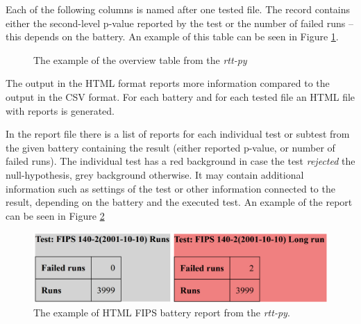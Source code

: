 \documentclass[
  digital,     %
  oneside,     %
  nosansbold,  %
  nocolorbold, %
  nolof,         %
  nolot,         %
]{fithesis4}
\begin{document}
Each of the following columns is named after one tested file. The record contains either the second-level p-value reported by the test or the number of failed runs -- this depends on the battery. An example of this table can be seen in Figure \ref{fig:rtt_py_table}.

\begin{figure}
  \begin{center}
  \end{center}
  \caption{The example of the overview table from the \emph{rtt-py}}
  \label{fig:rtt_py_table}
\end{figure}


The output in the HTML format reports more information compared to the output in the CSV format. For each battery and for each tested file an HTML file with reports is generated.

In the report file there is a list of reports for each individual test or subtest from the given battery containing the result (either reported p-value, or number of failed runs). The individual test has a red background in case the test \emph{rejected} the null-hypothesis, grey background otherwise. It may contain additional information such as settings of the test or other information connected to the result, depending on the battery and the executed test. An example of the  report can be seen in Figure \ref{fig:rtt_py_html}
\begin{figure}
  \begin{center}
    \includegraphics[width=12.5cm]{figures/rtt-py.png}
  \end{center}
  \caption{The example of HTML FIPS battery report from the \emph{rtt-py}.}
  \label{fig:rtt_py_html}
\end{figure}
\end{document}
